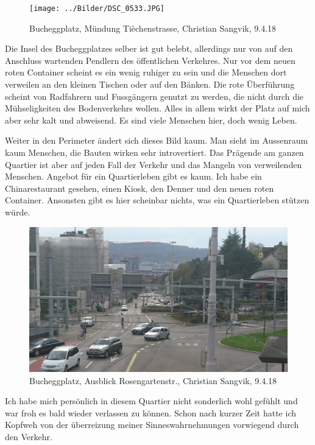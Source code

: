 \documentclass[a4paper,ngerman,11pt]{scrartcl}
\begin{document}
\begin{figure}[H]
\centering
\texttt{[image: ../Bilder/DSC\_0533.JPG]}
\caption{Bucheggplatz, Mündung Tièchenstrasse, Christian Sangvik, 9.4.18}
\end{figure}

Die Insel des Bucheggplatzes selber ist gut belebt, allerdings nur von auf den
Anschluss wartenden Pendlern des öffentlichen Verkehres. Nur vor dem neuen
roten Container scheint es ein wenig ruhiger zu sein und die Menschen dort
verweilen an den kleinen Tischen oder auf den Bänken. Die rote Überführung
scheint von Radfahrern und Fussgängern genutzt zu werden, die nicht durch die
Mühseligkeiten des Bodenverkehrs wollen. Alles in allem wirkt der Platz auf
mich aber sehr kalt und abweisend. Es sind viele Menschen hier, doch wenig
Leben.

Weiter in den Perimeter ändert sich dieses Bild kaum. Man sieht im Aussenraum
kaum Menschen, die Bauten wirken sehr introvertiert. Das Prägende am ganzen
Quartier ist aber auf jeden Fall der Verkehr und das Mangeln von verweilenden
Menschen. Angebot für ein Quartierleben gibt es kaum. Ich habe ein
Chinarestaurant gesehen, einen Kiosk, den Denner und den neuen roten
Container. Ansonsten gibt es hier scheinbar nichts, was ein Quartierleben
stützen würde.

\begin{figure}[H]
\centering
\includegraphics[width=\textwidth]{../Bilder/DSC_0555.JPG}
\caption{Bucheggplatz, Ausblick Rosengartenstr., Christian Sangvik, 9.4.18}
\end{figure}

Ich habe mich persönlich in diesem Quartier nicht sonderlich wohl gefühlt und
war froh es bald wieder verlassen zu können. Schon nach kurzer Zeit hatte ich
Kopfweh von der überreizung meiner Sinneswahrnehmungen vorwiegend durch den
Verkehr.
\end{document}
